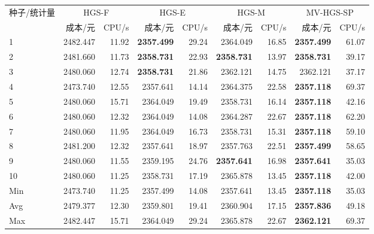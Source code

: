 \begin{tabular}{@{}lrrrrrrrr@{}}
\toprule
种子/统计量 & \multicolumn{2}{c}{HGS-F} & \multicolumn{2}{c}{HGS-E} & \multicolumn{2}{c}{HGS-M} & \multicolumn{2}{c}{MV-HGS-SP}\\
 & 成本/元 & CPU/s & 成本/元 & CPU/s & 成本/元 & CPU/s & 成本/元 & CPU/s\\
\midrule
1 & 2482.447 & 11.92 & \textbf{2357.499} & 29.24 & 2364.049 & 16.85 & \textbf{2357.499} & 61.07 \\
2 & 2481.660 & 11.73 & \textbf{2358.731} & 22.93 & \textbf{2358.731} & 13.97 & \textbf{2358.731} & 39.17 \\
3 & 2480.060 & 12.74 & \textbf{2358.731} & 21.86 & 2362.121 & 14.75 & 2362.121 & 37.17 \\
4 & 2473.740 & 12.55 & 2357.641 & 14.14 & 2364.375 & 22.58 & \textbf{2357.118} & 69.37 \\
5 & 2480.060 & 15.71 & 2364.049 & 19.49 & 2358.731 & 16.14 & \textbf{2357.118} & 42.16 \\
6 & 2480.060 & 12.32 & 2364.049 & 14.08 & 2364.287 & 22.67 & \textbf{2357.118} & 62.20 \\
7 & 2480.060 & 11.95 & 2364.049 & 16.73 & 2358.731 & 15.31 & \textbf{2357.118} & 59.10 \\
8 & 2481.200 & 12.32 & 2357.641 & 18.97 & 2357.763 & 22.51 & \textbf{2357.499} & 58.65 \\
9 & 2480.060 & 11.55 & 2359.195 & 24.76 & \textbf{2357.641} & 16.98 & \textbf{2357.641} & 35.03 \\
10 & 2480.060 & 11.25 & 2358.731 & 17.19 & 2365.878 & 13.45 & \textbf{2357.118} & 42.00 \\
Min & 2473.740 & 11.25 & 2357.499 & 14.08 & 2357.641 & 13.45 & \textbf{2357.118} & 35.03 \\
Avg & 2479.377 & 12.30 & 2359.801 & 19.41 & 2360.904 & 17.15 & \textbf{2357.836} & 49.18 \\
Max & 2482.447 & 15.71 & 2364.049 & 29.24 & 2365.878 & 22.67 & \textbf{2362.121} & 69.37 \\
\bottomrule
\end{tabular}
